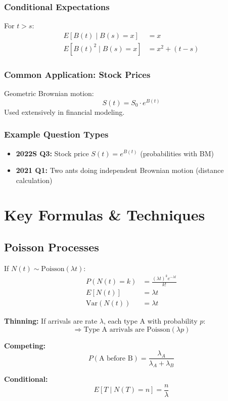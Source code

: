 \documentclass[11pt,letterpaper]{article}
\begin{document}
\subsubsection{Conditional Expectations}

For $t > s$:
\begin{align*}
E[B(t) \mid B(s) = x] &= x \\
E[B(t)^2 \mid B(s) = x] &= x^2 + (t - s)
\end{align*}

\subsubsection{Common Application: Stock Prices}

Geometric Brownian motion:
\[
S(t) = S_0 \cdot e^{B(t)}
\]
Used extensively in financial modeling.

\subsubsection{Example Question Types}

\begin{itemize}[leftmargin=*]
  \item \textbf{2022S Q3:} Stock price $S(t) = e^{B(t)}$ (probabilities with BM)
  \item \textbf{2021 Q1:} Two ants doing independent Brownian motion (distance calculation)
\end{itemize}

\newpage

\section{Key Formulas \& Techniques}

\subsection{Poisson Processes}

\begin{tcolorbox}[colback=blue!5,colframe=blue!70,title=Poisson Process Formulas]
If $N(t) \sim \text{Poisson}(\lambda t)$:
\begin{align*}
P(N(t) = k) &= \frac{(\lambda t)^k e^{-\lambda t}}{k!} \\
E[N(t)] &= \lambda t \\
\text{Var}(N(t)) &= \lambda t
\end{align*}

\textbf{Thinning:} If arrivals are rate $\lambda$, each type A with probability $p$:
\[
\Rightarrow \text{Type A arrivals are Poisson}(\lambda p)
\]

\textbf{Competing:}
\[
P(\text{A before B}) = \frac{\lambda_A}{\lambda_A + \lambda_B}
\]

\textbf{Conditional:}
\[
E[T \mid N(T) = n] = \frac{n}{\lambda}
\]
\end{tcolorbox}
\end{document}
